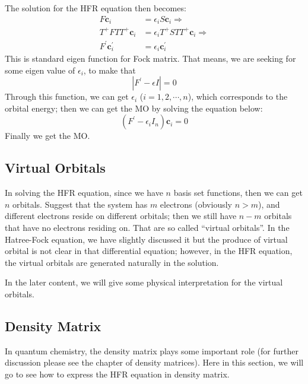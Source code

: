 The solution for the HFR equation then becomes: 
\begin{align}\label{HFTeq:42}
F\bm{c}_{i} &= \epsilon_{i}S\bm{c}_{i} \Rightarrow \nonumber \\
T^{+}FTT^{+}\bm{c}_{i} &= \epsilon_{i}T^{+}STT^{+}\bm{c}_{i} \Rightarrow
\nonumber \\
F^{'}\bm{c}^{'}_{i} &=\epsilon_{i}\bm{c}^{'}_{i} 
\end{align}
This is standard eigen function for Fock matrix. That means, we are seeking for
some eigen value of $\epsilon_{i}$, to make that
\begin{equation}\label{}
|F^{'} - \epsilon I| = 0
\end{equation}
Through this function, we can get $\epsilon_{i}$ ($i=1,2,\cdots,n$), which
corresponds to the orbital energy; then we can get the MO by solving the
equation below:
\begin{equation}
 (F^{'} - \epsilon_{i}I_{n})\bm{c}_{i} = 0
\end{equation}
Finally we get the MO.

\subsection{Virtual Orbitals}
%
%
In solving the HFR equation, since we have $n$ basis set functions, then we can
get $n$ orbitals. Suggest that the system has $m$ electrons (obviously $n > m$),
and different electrons reside on different orbitals; then we still have $n-m$
orbitals that have no electrons residing on. That are so called ``virtual
orbitals''. In the Hatree-Fock equation, we have slightly discussed it but the
produce of virtual orbital is not clear in that differential equation; however,
in the HFR equation, the virtual orbitals are generated naturally in the
solution.

In the later content, we will give some physical interpretation for the virtual
orbitals.



\subsection{Density Matrix}\label{HFT:5}
%
%
%
In quantum chemistry, the density matrix plays some important role (for
further discussion please see the chapter of density matrices). Here
in this section, we will go to see how to express the HFR equation
in density matrix.

